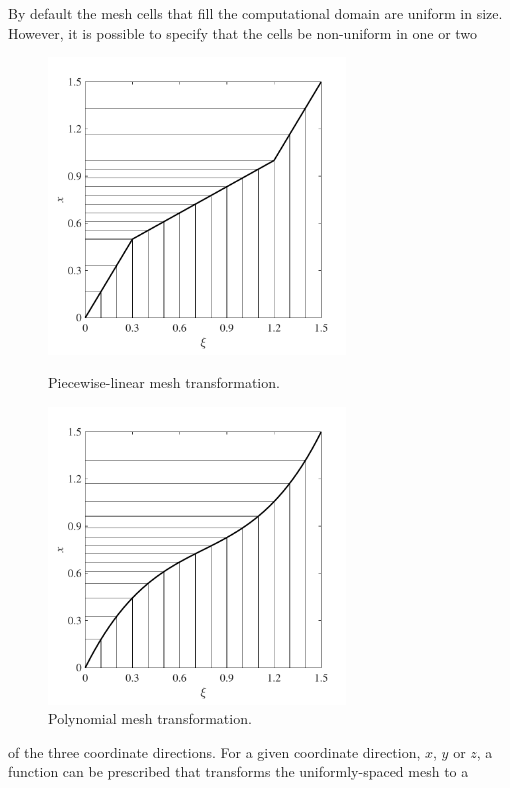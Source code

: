 \documentclass[11pt]{book}
\begin{document}
By default the mesh cells that fill the computational domain are uniform in size.
However, it is possible to specify that the cells be non-uniform in one or two
\begin{figure}[ht]
\begin{minipage}[t]{3.1in}
\includegraphics[width=3.1in]{SCRIPT_FIGURES/piece_wise_linear_trnx}
\vspace{-.2in}
\caption[Piecewise-linear mesh transformation]{Piecewise-linear mesh transformation.}
\label{fig:grid2}
\end{minipage}
\hfill
\begin{minipage}[t]{3.1in}
\includegraphics[width=3.1in]{SCRIPT_FIGURES/polynomial_trnx}
\vspace{-.2in}
\caption[Polynomial mesh transformation]{Polynomial mesh transformation.}
\label{fig:grid1}
\end{minipage}
\end{figure}
of the three coordinate directions.
For a given coordinate direction, $x$, $y$ or $z$, a function can be
prescribed that transforms the uniformly-spaced mesh to a
\end{document}
